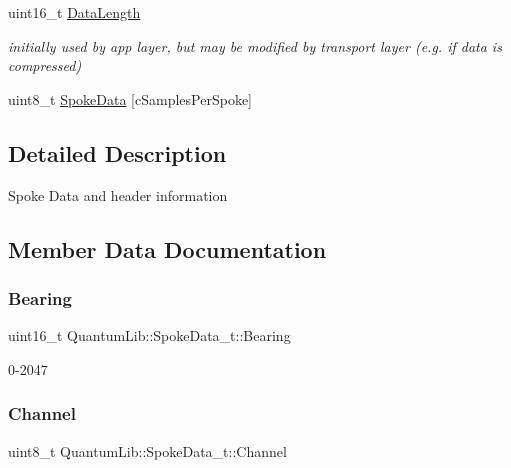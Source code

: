 \begin{DoxyCompactItemize}
uint16\+\_\+t \mbox{\hyperlink{struct_quantum_lib_1_1_spoke_data__t_ae92e5c137923fd5a8ff4f0fbbe0dbbaf}{Data\+Length}}
\begin{DoxyCompactList}\small\item\em initially used by app layer, but may be modified by transport layer (e.\+g. if data is compressed) \end{DoxyCompactList}\item 
uint8\+\_\+t \mbox{\hyperlink{struct_quantum_lib_1_1_spoke_data__t_ad37442613255475db25e2abf2691ee09}{Spoke\+Data}} \mbox{[}c\+Samples\+Per\+Spoke\mbox{]}
\end{DoxyCompactItemize}


\subsection{Detailed Description}
Spoke Data and header information 

\subsection{Member Data Documentation}
\mbox{\label{struct_quantum_lib_1_1_spoke_data__t_a591b1e8718daebd744cf8480f7776730}} 
\subsubsection{\texorpdfstring{Bearing}{Bearing}}
{\footnotesize\ttfamily uint16\+\_\+t Quantum\+Lib\+::\+Spoke\+Data\+\_\+t\+::\+Bearing}



0-\/2047 

\mbox{\label{struct_quantum_lib_1_1_spoke_data__t_a235bdd0acf5a02fe888939c909de9566}} 
\subsubsection{\texorpdfstring{Channel}{Channel}}
{\footnotesize\ttfamily uint8\+\_\+t Quantum\+Lib\+::\+Spoke\+Data\+\_\+t\+::\+Channel}




